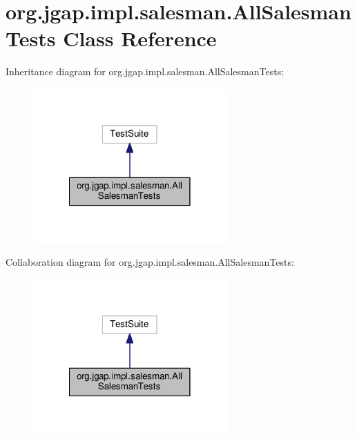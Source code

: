 \hypertarget{classorg_1_1jgap_1_1impl_1_1salesman_1_1_all_salesman_tests}{\section{org.\-jgap.\-impl.\-salesman.\-All\-Salesman\-Tests Class Reference}
\label{classorg_1_1jgap_1_1impl_1_1salesman_1_1_all_salesman_tests}
}


Inheritance diagram for org.\-jgap.\-impl.\-salesman.\-All\-Salesman\-Tests\-:
\nopagebreak
\begin{figure}[H]
\begin{center}
\leavevmode
\includegraphics[width=210pt]{classorg_1_1jgap_1_1impl_1_1salesman_1_1_all_salesman_tests__inherit__graph}
\end{center}
\end{figure}


Collaboration diagram for org.\-jgap.\-impl.\-salesman.\-All\-Salesman\-Tests\-:
\nopagebreak
\begin{figure}[H]
\begin{center}
\leavevmode
\includegraphics[width=210pt]{classorg_1_1jgap_1_1impl_1_1salesman_1_1_all_salesman_tests__coll__graph}
\end{center}
\end{figure}

